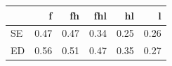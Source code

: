 \begin{tabular}{lrrrrr}
\toprule
 & f & fh & fhl & hl & l \\
\midrule
SE & 0.47 & 0.47 & 0.34 & 0.25 & 0.26 \\
ED & 0.56 & 0.51 & 0.47 & 0.35 & 0.27 \\
\bottomrule
\end{tabular}
